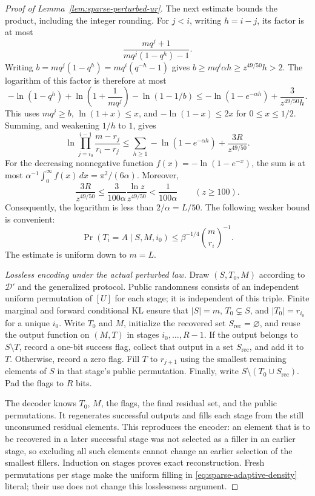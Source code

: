\documentclass[11pt,letterpaper]{article}
\numberwithin{equation}{section}
\begin{document}
\begin{proof}[Proof of Lemma~\ref{lem:sparse-perturbed-ur}]
The next estimate bounds the product, including the integer rounding.
For $j<i$, writing $h=i-j$, its factor is at most
\[
 \frac{mq^j+1}{mq^j(1-q^h)-1}.
\]
Writing $b=mq^j(1-q^h)=mq^i(q^{-h}-1)$ gives $b\ge mq^i\alpha h\ge z^{49/50}h>2$.
The logarithm of this factor is therefore at most
\[
 -\ln(1-q^h)+\ln\left(1+\frac1{mq^j}\right)
                 -\ln(1-1/b)
 \le-\ln(1-e^{-\alpha h})+\frac3{z^{49/50}h}.
\]
This uses $mq^j\ge b$, $\ln(1+x)\le x$, and $-\ln(1-x)\le2x$ for $0\le x\le1/2$.
Summing, and weakening $1/h$ to $1$, gives
\[
 \ln\prod_{j=i_0}^{i-1}\frac{m-r_j}{r_i-r_j}
 \le\sum_{h\ge1}-\ln(1-e^{-\alpha h})
       +\frac{3R}{z^{49/50}}.
\]
For the decreasing nonnegative function $f(x)=-\ln(1-e^{-x})$, the sum is at most $\alpha^{-1}\int_0^\infty f(x)\,dx=\pi^2/(6\alpha)$.
Moreover,
\[
 \frac{3R}{z^{49/50}}
 \le\frac{3}{100\alpha}\frac{\ln z}{z^{49/50}}
 <\frac{1}{100\alpha}\qquad(z\ge100).
\]
Consequently, the logarithm is less than $2/\alpha=L/50$.
The following weaker bound is convenient:
\begin{equation}
 \Pr(T_i=A\mid S,M,i_0)
 \le\beta^{-1/4}\binom{m}{r_i}^{-1}.
 \label{eq:sparse-density-loss}
\end{equation}
The estimate is uniform down to $m=L$.

\emph{Lossless encoding under the actual perturbed law.} Draw $(S,T_0,M)$ according to $\mathcal D'$ and the generalized protocol.
Public randomness consists of an independent uniform permutation of $[U]$ for each stage; it is independent of this triple.
Finite marginal and forward conditional KL ensure that $|S|=m$, $T_0\subsetneq S$, and $|T_0|=r_{i_0}$ for a unique $i_0$.
Write $T_0$ and $M$, initialize the recovered set $S_{\mathrm{rec}}=\varnothing$, and reuse the output function on $(M,T)$ in stages $i_0,\ldots,R-1$.
If the output belongs to $S\setminus T$, record a one-bit success flag, collect that output in a set $S_{\mathrm{rec}}$, and add it to $T$.
Otherwise, record a zero flag.
Fill $T$ to $r_{j+1}$ using the smallest remaining elements of $S$ in that stage's public permutation.
Finally, write $S\setminus(T_0\cup S_{\mathrm{rec}})$.
Pad the flags to $R$ bits.

The decoder knows $T_0$, $M$, the flags, the final residual set, and the public permutations.
It regenerates successful outputs and fills each stage from the still unconsumed residual elements.
This reproduces the encoder: an element that is to be recovered in a later successful stage was not selected as a filler in an earlier stage, so excluding all such elements cannot change an earlier selection of the smallest fillers.
Induction on stages proves exact reconstruction.
Fresh permutations per stage make the uniform filling in \eqref{eq:sparse-adaptive-density} literal; their use does not change this losslessness argument.


\end{proof}
\end{document}
